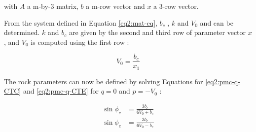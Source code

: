 with $A$ a m-by-3 matrix, $b$ a m-row vector and $x$  a 3-row vector. 

From the system defined in Equation \ref{eq2:mat-eq}, $b_c$ , $k$ and $V_0$  and can be determined. $k$ and $b_c$  are given by the second and third row of parameter vector $x$ , and $V_0$  is computed using the first row :

\begin{equation}
    V_0 = \frac{b_c}{x_1}
\end{equation}

The rock parameters can now be defined by solving Equations for \ref{eq2:pmc-q-CTC} and \ref{eq2:pmc-q-CTE} for $q=0$  and $p=-V_0$ :

\begin{align}
    \sin \phi_c &= \frac{3b_c}{6V_0+b_c} \\
    \sin \phi_e &= \frac{3b_c}{6V_0-b_e} 
\end{align}